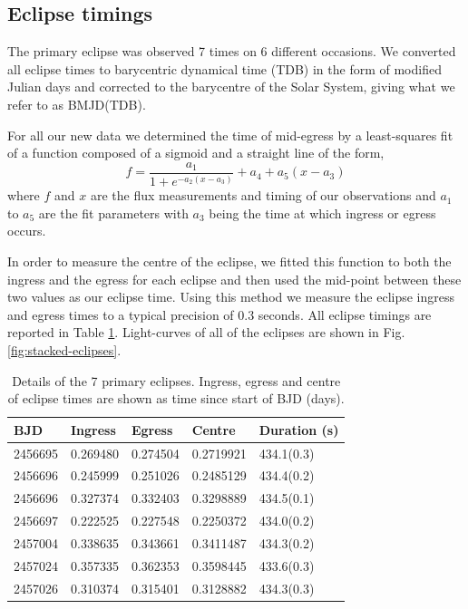 \documentclass[a4paper,fleqn,usenatbib]{mnras}
\begin{document}
\subsection{Eclipse timings}
The primary eclipse was observed 7 times on 6 different occasions.  We converted all eclipse times to barycentric dynamical time (TDB) in the form of modified Julian days and corrected to the barycentre of the Solar System, giving what we refer to as BMJD(TDB).

For all our new data we determined the time of mid-egress by a least-squares fit of a function composed of a sigmoid and a straight line of the form, 
\begin{equation}f = \frac{a_1}{1+e^{-a_2(x-a_3)}} + a_4 + a_5(x - a_3)\end{equation}
where $f$ and $x$ are the flux measurements and timing of our observations and $a_1$ to $a_5$ are the fit parameters with $a_3$ being the time at which ingress or egress occurs. 

In order to measure the centre of the eclipse, we fitted this function to both the ingress and the egress for each eclipse and then used the mid-point between these two values as our eclipse time. Using this method we measure the eclipse ingress and egress times to a typical precision of 0.3 seconds. All eclipse timings are reported in Table \ref{tab:eclipses}. Light-curves of all of the eclipses are shown in Fig. \ref{fig:stacked-eclipses}. 

\begin{table}
  \caption{Details of the 7 primary eclipses. Ingress, egress and centre of eclipse times are shown as time since start of BJD (days).}
  \begin{tabular}{ l  l  l  l  l  }
  \hline
 	BJD & Ingress & Egress & Centre & Duration (s) \\
  \hline
    2456695 & 0.269480 & 0.274504 & 0.2719921 & 434.1(0.3) \\
    2456696 & 0.245999 & 0.251026 & 0.2485129 & 434.4(0.2) \\
    2456696 & 0.327374 & 0.332403 & 0.3298889 & 434.5(0.1) \\
    2456697 & 0.222525 & 0.227548 & 0.2250372 & 434.0(0.2) \\
    2457004 & 0.338635 & 0.343661 & 0.3411487 & 434.3(0.2) \\
    2457024 & 0.357335 & 0.362353 & 0.3598445 & 433.6(0.3) \\
    2457026 & 0.310374 & 0.315401 & 0.3128882 & 434.3(0.3) \\
  \hline
  \end{tabular}
  \label{tab:eclipses}
\end{table}
\end{document}

